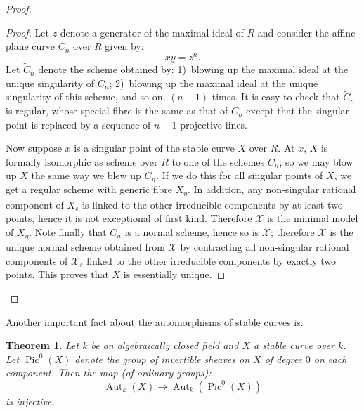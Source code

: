 \documentclass[10pt]{amsart}
\theoremstyle{plain}
\newtheorem{theorem}{Theorem}[section]
\theoremstyle{definition}
\DeclareMathOperator{\Pic}{Pic}
\DeclareMathOperator{\Aut}{Aut}
\begin{document}
\begin{proof}
\begin{proof}
Let $z$ denote a generator of the maximal ideal of $R$ and consider the affine plane curve $C_n$ over $R$ given by:
\[
xy = z^n.
\]
Let $\widetilde{C}_n$ denote the scheme obtained by: 1)~blowing up the maximal ideal at the unique singularity of $C_n$; 2)~blowing up the maximal ideal at the unique singularity of this scheme, and so on, $(n-1)$ times. It is easy to check that $\widetilde{C}_n$ is regular, whose special fibre is the same as that of $C_n$ except that the singular point is replaced by a sequence of $n-1$ projective lines.

Now suppose $x$ is a singular point of the stable curve $X$ over $R$. At $x$, $X$ is formally isomorphic as scheme over $R$ to one of the schemes $C_n$, so we may blow up $X$ the same way we blew up $C_n$. If we do this for all singular points of $X$, we get a regular scheme with generic fibre $X_\eta$. In addition, any non-singular rational component of $X_s$ is linked to the other irreducible components by at least two points, hence it is not exceptional of first kind. Therefore $\mathscr{X}$ is the minimal model of $X_\eta$. Note finally that $C_n$ is a normal scheme, hence so is $\mathscr{X}$; therefore $\mathscr{X}$ is the unique normal scheme obtained from $\mathscr{X}$ by contracting all non-singular rational components of $\mathscr{X}_s$ linked to the other irreducible components by exactly two points. This proves that $X$ is essentially unique.
\end{proof}
\end{proof}

Another important fact about the automorphisms of stable curves is:

\begin{theorem}\label{thm:1.13}
Let $k$ be an algebraically closed field and $X$ a stable curve over $k$. Let $\Pic^0(X)$ denote the group of invertible sheaves on $X$ of degree $0$ on each component. Then the map (of ordinary groups):
\[
\Aut_k(X) \longrightarrow \Aut_k(\Pic^0(X))
\]
is injective.
\end{theorem}
\end{document}
